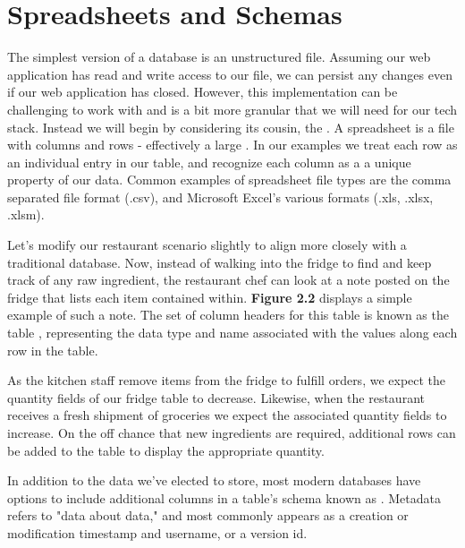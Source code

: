 \section{ Spreadsheets and Schemas }

The simplest version of a database is an unstructured file. Assuming our web application has read and write access to our file, we can persist any changes even if our web application has closed. However, this implementation can be challenging to work with and is a bit more granular that we will need for our tech stack. Instead we will begin by considering its cousin, the . A spreadsheet is a file with columns and rows - effectively a large . In our examples we treat each row as an individual entry in our table, and recognize each column as a a unique property of our data. Common examples of spreadsheet file types are the comma separated file format (.csv), and Microsoft Excel's various formats (.xls, .xlsx, .xlsm).


Let's modify our restaurant scenario slightly to align more closely with a traditional database. Now, instead of walking into the fridge to find and keep track of any raw ingredient, the restaurant chef can look at a note posted on the fridge that lists each item contained within. \textbf{Figure 2.2} displays a simple example of such a note. The set of column headers for this table is known as the table , representing the data type and name associated with the values along each row in the table.

As the kitchen staff remove items from the fridge to fulfill orders, we expect the quantity fields of our fridge table to decrease. Likewise, when the restaurant receives a fresh shipment of groceries we expect the associated quantity fields to increase. On the off chance that new ingredients are required, additional rows can be added to the table to display the appropriate quantity. 


In addition to the data we've elected to store, most modern databases have options to include additional columns in a table's schema known as . Metadata refers to "data about data," and most commonly appears as a creation or modification timestamp and username, or a version id. 

